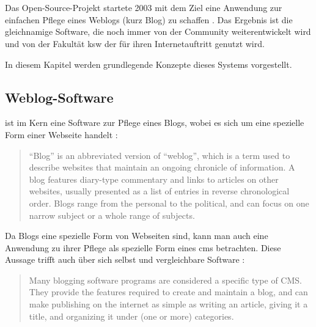\section{\wordpress}
    Das Open-Source-Projekt {\wordpress} startete 2003
    mit dem Ziel eine Anwendung zur einfachen Pflege eines Weblogs
    (kurz Blog) zu schaffen \cite{wordpress:About}.
    Das Ergebnis ist die gleichnamige Software,
    die noch immer von der Community weiterentwickelt wird
    und von der Fakultät \gls{ksw} der {\fernUni} für ihren
    Internetauftritt genutzt wird.

    In diesem Kapitel werden grundlegende Konzepte dieses Systems vorgestellt.

    \subsection{Weblog-Software}
        \label{section:weblogSoftware}
        {\wordpress} ist im Kern eine Software zur Pflege eines Blogs,
        wobei es sich um eine spezielle Form einer Webseite handelt
        \cite{wordpress:Blogging}:

        \begin{quote}
            "`Blog"' is an abbreviated version of "`weblog"',
            which is a term used to describe websites that maintain
            an ongoing chronicle of information.
            A blog features diary-type commentary and links to articles
            on other websites, usually presented as a list of entries in
            reverse chronological order.
            Blogs range from the personal to the political,
            and can focus on one narrow subject or a whole range of subjects.
        \end{quote}

        Da Blogs eine spezielle Form von Webseiten sind,
        kann man auch eine Anwendung zu ihrer Pflege als
        spezielle Form eines \gls{cms} betrachten.
        Diese Aussage trifft {\wordpress} auch über sich selbst
        und vergleichbare Software \cite{wordpress:Blogging}:

        \begin{quote}
            Many blogging software programs are considered a specific type of CMS.
            They provide the features required to create and maintain a blog,
            and can make publishing on the internet as simple as writing an article,
            giving it a title, and organizing it under (one or more) categories.
        \end{quote}

